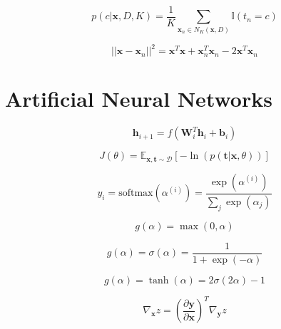\documentclass{article}
\begin{document}
\begin{equation}
    p(c | \mathbf{x}, D, K) = \frac{1}{K} \sum_{\mathbf{x}_n \in N_K(\mathbf{x}, D)} \mathbb{I}(t_n = c)
\end{equation}

\begin{equation}
    ||\mathbf{x} - \mathbf{x}_n||^2 = \mathbf{x}^T \mathbf{x} + \mathbf{x}_n^T \mathbf{x}_n - 2\mathbf{x}^T \mathbf{x}_n
\end{equation}


\section{Artificial Neural Networks}

\begin{equation}
    \mathbf{h}_{i+1} = f(\mathbf{W}_i^T \mathbf{h}_i + \mathbf{b}_i)
\end{equation}

\begin{equation}
    J(\theta) = \mathbb{E}_{\mathbf{x}, \mathbf{t} \sim \mathcal{D}}[ - \ln(p(\mathbf{t} | \mathbf{x}, \theta)) ]
\end{equation}

\begin{equation}
    y_i = \text{softmax}(\alpha^{(i)}) = \frac{\exp(\alpha^{(i)})}{\sum_j \exp(\alpha_j)}
\end{equation}

\begin{equation}
    g(\alpha) = \max(0, \alpha)
\end{equation}

\begin{equation}
    g(\alpha) = \sigma(\alpha) = \frac{1}{1 + \exp(-\alpha)}
\end{equation}

\begin{equation}
    g(\alpha) = \tanh(\alpha) = 2\sigma(2\alpha) - 1
\end{equation}

\begin{equation}
    \nabla_{\mathbf{x}} z = \left( \frac{\partial \mathbf{y}}{\partial \mathbf{x}} \right)^T \nabla_{\mathbf{y}} z
\end{equation}
\end{document}
